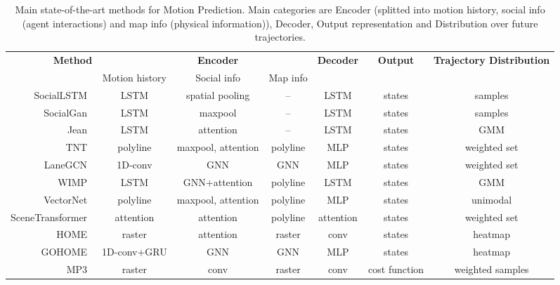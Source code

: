 \begin{table*}[t]
	\begin{center}
		\caption{Main state-of-the-art methods for Motion Prediction. Main categories are Encoder (splitted into motion history, social info (agent interactions) and map info (physical information)), Decoder, Output representation and Distribution over future trajectories.}
		\begin{tabular}{r |ccc|c|c|c}
			
			\toprule
			\textbf{Method}	&	& \textbf{Encoder}	&	& \textbf{Decoder}	& \textbf{Output}  & \textbf{Trajectory Distribution}	\\
			& Motion history	& Social info	& Map info	&	&	&	\\
			\midrule
			\midrule
			SocialLSTM~\cite{alahi2016social}	& LSTM	& spatial pooling	& --	& LSTM	& states	& samples	\\
			SocialGan~\cite{gupta2018social}	& LSTM	& maxpool	& --	& LSTM	& states	& samples	\\
			Jean~\cite{mercat2020multiattentmotion}	& LSTM	& attention	& --	& LSTM	& states	& GMM	\\
			TNT~\cite{zhao2020tnt}	& polyline	& maxpool, attention	& polyline	& MLP	& states	& weighted set	\\
			LaneGCN~\cite{liang2020learninggraph}	& 1D-conv	& GNN	& GNN	& MLP	& states	& weighted set	\\
			WIMP~\cite{khandelwal2020if}	& LSTM	& GNN+attention	& polyline	& LSTM	& states	& GMM	\\
			VectorNet~\cite{gao2020vectornet}	& polyline	& maxpool, attention	& polyline	& MLP	& states	& unimodal	\\
			SceneTransformer~\cite{ngiam2021scene}	& attention	& attention	& polyline	& attention	& states	& weighted set	\\
			HOME~\cite{gilles2021home}	& raster	& attention	& raster	& conv	& states	& heatmap	\\
			GOHOME~\cite{gilles2021gohome}	& 1D-conv+GRU	& GNN	& GNN	& MLP	& states	& heatmap	\\
			MP3~\cite{casas2021mp3}	& raster	& conv	& raster	& conv	& cost function	& weighted samples	\\

\end{tabular}
\end{center}
\end{table*}
